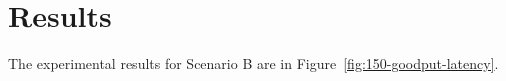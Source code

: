 \section{Results}
\label{sec:results}

The experimental results for Scenario B are in Figure~\ref{fig:150-goodput-latency}.

